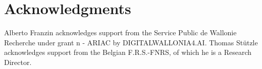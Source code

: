 \section*{Acknowledgments}
Alberto Franzin acknowledges support from the 
Service Public de Wallonie Recherche under grant n - ARIAC by DIGITALWALLONIA4.AI.
Thomas St\"utzle acknowledges support from the Belgian F.R.S.-FNRS,
of which he is a Research Director. 



